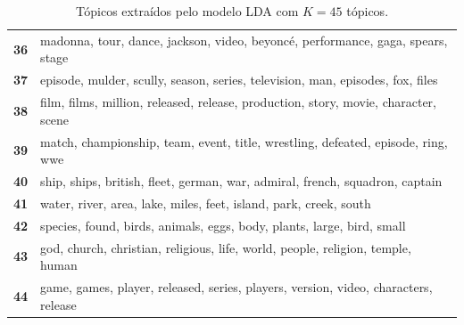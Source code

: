\begin{table}[htpb]
\begin{tabularx}{\textwidth}{@{}l X@{}}
        \textbf{36} & madonna, tour, dance, jackson, video, beyoncé, performance, gaga, spears, stage \\
        \textbf{37} & episode, mulder, scully, season, series, television, man, episodes, fox, files \\
        \textbf{38} & film, films, million, released, release, production, story, movie, character, scene \\
        \textbf{39} & match, championship, team, event, title, wrestling, defeated, episode, ring, wwe \\
        \textbf{40} & ship, ships, british, fleet, german, war, admiral, french, squadron, captain \\
        \textbf{41} & water, river, area, lake, miles, feet, island, park, creek, south \\
        \textbf{42} & species, found, birds, animals, eggs, body, plants, large, bird, small \\
        \textbf{43} & god, church, christian, religious, life, world, people, religion, temple, human \\
        \textbf{44} & game, games, player, released, series, players, version, video, characters, release \\
        \bottomrule
    \end{tabularx}
    \caption{Tópicos extraídos pelo modelo LDA com $K=45$ tópicos.}
    \label{tab:topicos_lda_45}
\end{table}
